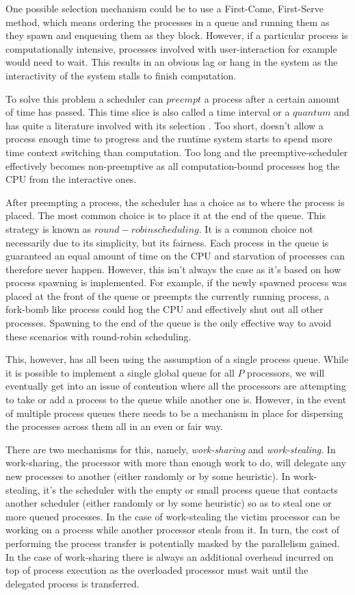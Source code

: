 One possible selection mechanism could be to use a First-Come, First-Serve method, 
which means ordering 
the processes in a queue and running them as they spawn and enqueuing them as they 
block. However, if a particular
process is computationally intensive, processes involved with user-interaction 
for example would need to wait. This results in an obvious lag or hang in the 
system as the interactivity of the system stalls to finish computation.

To solve this problem a scheduler can $preempt$ a process after a certain amount
of time has passed. This time slice is also called a time interval or a $quantum$
and has quite a literature involved with its selection
\cite{alam2008finding, mostafa2010finding, saeidi2012determining}.
Too short, doesn't allow a process enough time to progress and the runtime system
starts to spend more time context switching than computation. Too long and the
preemptive-scheduler effectively becomes non-preemptive as all computation-bound
processes hog the CPU from the interactive ones.

After preempting a process, the scheduler has a choice as to where the process
is placed. The most common choice is to place it at the end of the queue. This
strategy is known as $round-robin scheduling$. It is a common choice not
necessarily due to its simplicity, but its fairness. Each process in the queue
is guaranteed an equal amount of time on the CPU and starvation of processes
can therefore never happen. However, this isn't always the case as it's based
on how process spawning is implemented. For example, if the newly spawned
process was placed at the front of the queue or preempts the currently running
process, a fork-bomb like process could hog the CPU and effectively shut out
all other processes. Spawning to the end of the queue is the only effective way
to avoid these scenarios with round-robin scheduling.

This, however, has all been using the assumption of a single process queue. While
it is possible to implement a single global queue for all $P$ processors, we will
eventually get into an issue of contention where all the processors are 
attempting to take or add a process to the queue while another one is. However,
in the event of multiple process queues there needs to be a mechanism in place 
for dispersing the processes across them all in an even or fair way.

There are two mechanisms for this, namely, \emph{work-sharing} and
\emph{work-stealing}. In work-sharing, the processor with more than enough work
to do, will delegate any new processes to another (either randomly or by some
heuristic). In work-stealing, it's the scheduler with the empty or small
process queue that contacts another scheduler (either randomly or by some
heuristic) so as to steal one or more queued processes. In the case of
work-stealing the victim processor can be working on a process while another
processor steals from it. In turn, the cost of performing the process transfer
is potentially masked by the parallelism gained. In the case of work-sharing
there is always an additional overhead incurred on top of process execution as
the overloaded processor must wait until the delegated process is transferred.


